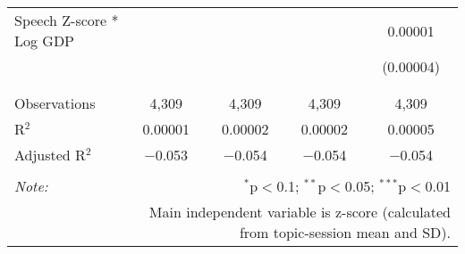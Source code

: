 \begin{table}[!htbp]
\begin{tabular}{@{\extracolsep{5pt}}lcccc}
 Speech Z-score * Log GDP &  &  &  & 0.00001 \\ 
  &  &  &  & (0.00004) \\ 
  & & & & \\ 
\hline \\[-1.8ex] 
Observations & 4,309 & 4,309 & 4,309 & 4,309 \\ 
R$^{2}$ & 0.00001 & 0.00002 & 0.00002 & 0.00005 \\ 
Adjusted R$^{2}$ & $-$0.053 & $-$0.054 & $-$0.054 & $-$0.054 \\ 
\hline 
\hline \\[-1.8ex] 
\textit{Note:}  & \multicolumn{4}{r}{$^{*}$p$<$0.1; $^{**}$p$<$0.05; $^{***}$p$<$0.01} \\ 
 & \multicolumn{4}{r}{Main independent variable is z-score (calculated from topic-session mean and SD).} \\ 
\end{tabular} 
\end{table} 

